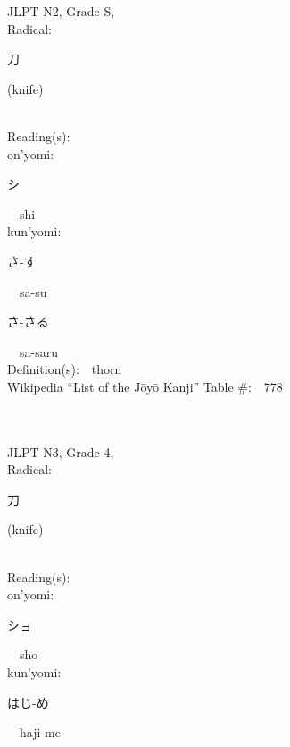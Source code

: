 \begin{multicols}{2}
{JLPT N2, Grade S, \\Radical:\ \ {\begin{CJK}{UTF8}{min} 刀 \end{CJK}} (knife) } \\
Reading(s):\ \ \\
{\hspace*{1em}}on'yomi:\ \ \\
{\hspace*{2em}}{\begin{CJK}{UTF8}{min} シ \end{CJK}}\ \ shi\ \ \\
{\hspace*{1em}}kun'yomi:\ \ \\
{\hspace*{2em}}{\begin{CJK}{UTF8}{min} さ-す \end{CJK}}\ \ sa-su\ \ \\
{\hspace*{2em}}{\begin{CJK}{UTF8}{min} さ-さる \end{CJK}}\ \ sa-saru\ \ \\
Definition(s):\ \ thorn \\
Wikipedia ``List of the J\=oy\=o Kanji'' Table \#:\ \ 778 \\
\ \ \\
{\fontsize{34pt}{40pt}  }\ \ \\  %
{JLPT N3, Grade 4, \\Radical:\ \ {\begin{CJK}{UTF8}{min} 刀 \end{CJK}} (knife) } \\
Reading(s):\ \ \\
{\hspace*{1em}}on'yomi:\ \ \\
{\hspace*{2em}}{\begin{CJK}{UTF8}{min} ショ \end{CJK}}\ \ sho\ \ \\
{\hspace*{1em}}kun'yomi:\ \ \\
{\hspace*{2em}}{\begin{CJK}{UTF8}{min} はじ-め \end{CJK}}\ \ haji-me\ \ \\

\end{multicols}
